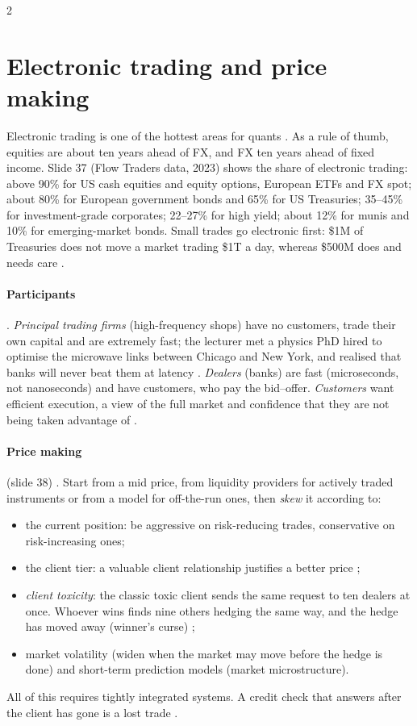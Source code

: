 \begin{paracol}{2}
\section{Electronic trading and price making}\label{ch06:sec-etrading}
Electronic trading is one of the hottest areas for quants . As a rule of thumb, equities are
about ten years ahead of FX, and FX ten years ahead of fixed income. Slide 37 (Flow Traders data, 2023) shows the
share of electronic trading: above 90\% for US cash equities and equity options, European ETFs and FX spot;
about 80\% for European government bonds and 65\% for US Treasuries; 35--45\% for investment-grade corporates;
22--27\% for high yield; about 12\% for munis and 10\% for emerging-market bonds. Small trades go electronic first:
\$1M of Treasuries does not move a market trading \$1T a day, whereas \$500M does and needs care
.

\paragraph{Participants} . \emph{Principal trading firms} (high-frequency shops) have no
customers, trade their own capital and are extremely fast; the lecturer met a physics PhD hired to optimise the
microwave links between Chicago and New York, and realised that banks will never beat them at latency
. \emph{Dealers} (banks) are fast (microseconds, not nanoseconds) and have customers, who pay
the bid--offer. \emph{Customers} want efficient execution, a view of the full market and confidence that they are
not being taken advantage of .

\paragraph{Price making} (slide 38) . Start from a mid price, from liquidity providers for
actively traded instruments or from a model for off-the-run ones, then \emph{skew} it according to:
\begin{itemize}
  \item the current position: be aggressive on risk-reducing trades, conservative on risk-increasing ones;
  \item the client tier: a valuable client relationship justifies a better price ;
  \item \emph{client toxicity}: the classic toxic client sends the same request to ten dealers at once. Whoever
        wins finds nine others hedging the same way, and the hedge has moved away (winner's curse)
        ;
  \item market volatility (widen when the market may move before the hedge is done) and short-term prediction
        models (market microstructure).
\end{itemize}
All of this requires tightly integrated systems. A credit check that answers after the client has gone is a lost
trade .


\end{paracol}
